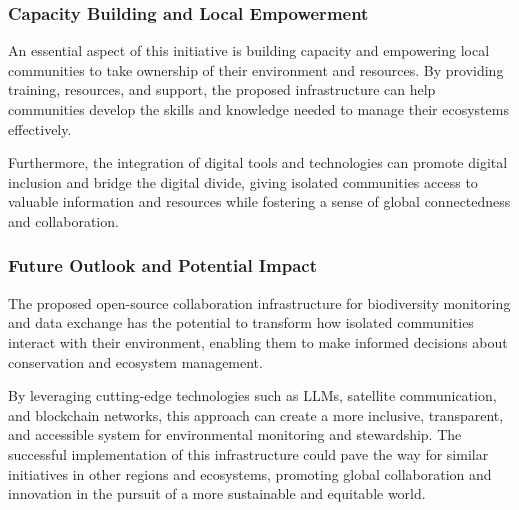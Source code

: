 \subsubsection{Capacity Building and Local Empowerment}
An essential aspect of this initiative is building capacity and empowering local communities to take ownership of their environment and resources. By providing training, resources, and support, the proposed infrastructure can help communities develop the skills and knowledge needed to manage their ecosystems effectively.

Furthermore, the integration of digital tools and technologies can promote digital inclusion and bridge the digital divide, giving isolated communities access to valuable information and resources while fostering a sense of global connectedness and collaboration.

\subsubsection{Future Outlook and Potential Impact}
The proposed open-source collaboration infrastructure for biodiversity monitoring and data exchange has the potential to transform how isolated communities interact with their environment, enabling them to make informed decisions about conservation and ecosystem management.

By leveraging cutting-edge technologies such as LLMs, satellite communication, and blockchain networks, this approach can create a more inclusive, transparent, and accessible system for environmental monitoring and stewardship. The successful implementation of this infrastructure could pave the way for similar initiatives in other regions and ecosystems, promoting global collaboration and innovation in the pursuit of a more sustainable and equitable world.